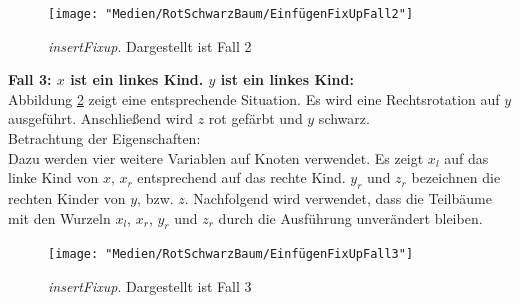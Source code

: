 \documentclass[a4paper,12pt]{article}
\begin{document}
\begin{figure}[H]
	\centering
	\texttt{[image: "Medien/RotSchwarzBaum/EinfügenFixUpFall2"]}
	\caption{\textit{insertFixup}. Dargestellt ist Fall 2  }
	\label{fig:EinfügenFixUpFall2}
\end{figure}

\noindent\textbf{Fall 3: $x$ ist ein linkes Kind. $y$ ist ein linkes Kind: }\\
\noindent Abbildung \ref{fig:EinfügenFixUpFall3} zeigt eine entsprechende Situation. Es wird eine Rechtsrotation auf $y$ ausgeführt. Anschließend wird $z$ rot gefärbt und $y$ schwarz. \\

\noindent Betrachtung der Eigenschaften:\\
\noindent Dazu werden vier weitere Variablen auf Knoten verwendet. Es zeigt $x_l$ auf das linke Kind von $x$,  $x_r$ entsprechend auf das rechte Kind. $y_r$ und $z_r$ bezeichnen die rechten Kinder von $y$, bzw. $z$. Nachfolgend wird verwendet, dass die Teilbäume mit den Wurzeln $x_l$, $x_r$, $y_r$ und $z_r$ durch die Ausführung unverändert bleiben.
\begin{figure}[H]
	\centering
	\texttt{[image: "Medien/RotSchwarzBaum/EinfügenFixUpFall3"]}
	\caption{\textit{insertFixup}. Dargestellt ist Fall 3  }
	\label{fig:EinfügenFixUpFall3}
\end{figure}
\end{document}
